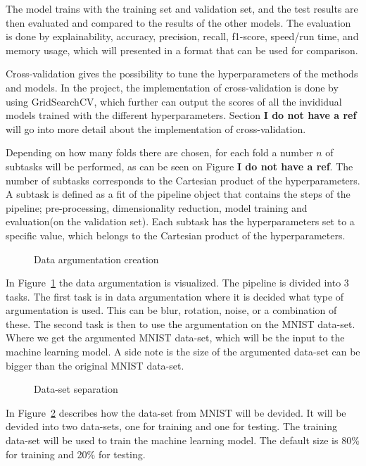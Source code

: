 The model trains with the training set and validation set, and the test results are then evaluated and compared to the results of the other models. The evaluation is done by explainability, accuracy, precision, recall, f1-score, speed/run time, and memory usage, which will presented in a format that can be used for comparison.

 
Cross-validation gives the possibility to tune the hyperparameters of the methods and models. In the project, the implementation of cross-validation is done by using GridSearchCV, which further can output the scores of all the invididual models trained with the different hyperparameters. Section \textbf{I do not have a ref} will go into more detail about the implementation of cross-validation.

Depending on how many folds there are chosen, for each fold a number $n$ of subtasks will be performed, as can be seen on Figure \textbf{I do not have a ref}. The number of subtasks corresponds to the Cartesian product of the hyperparameters. A subtask is defined as a fit of the pipeline object that contains the steps of the pipeline; pre-processing, dimensionality reduction, model training and evaluation(on the validation set). Each subtask has the hyperparameters set to a specific value, which belongs to the Cartesian product of the hyperparameters.




\begin{figure}[htb!]
    \centering
    
    \caption{Data argumentation creation}
    \label{fig:data-argumentation-create}
\end{figure}

In Figure~\ref{fig:data-argumentation-create} the data argumentation is visualized. The pipeline is divided into 3 tasks. The first task is in data argumentation where it is decided what type of argumentation is used. This can be blur, rotation, noise, or a combination of these. The second task is then to use the argumentation on the MNIST data-set. Where we get the argumented MNIST data-set, which will be the input to the machine learning model. A side note is the size of the argumented data-set can be bigger than the original MNIST data-set.

\begin{figure}[htb!]
    \centering
    
    \caption{Data-set separation}
    \label{fig:data-set-sepa}
\end{figure}

In Figure~\ref{fig:data-set-sepa} describes how the data-set from MNIST will be devided. It will be devided into two data-sets, one for training and one for testing. The training data-set will be used to train the machine learning model. The default size is 80\% for training and 20\% for testing.